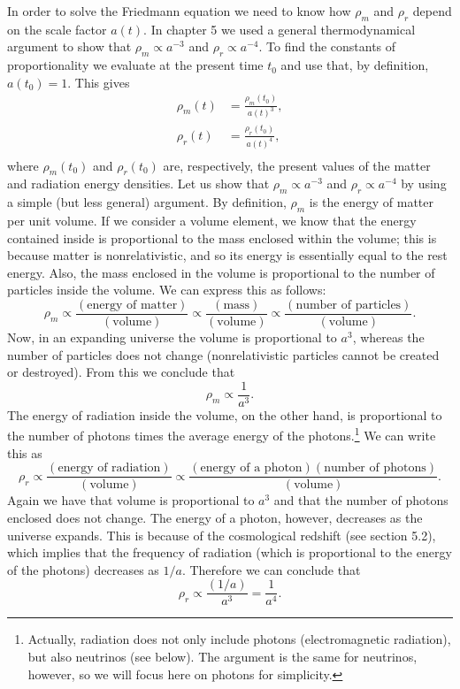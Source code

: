 \documentclass[11pt, a4paper,oneside,openright]{book}
\numberwithin{equation}{section}
\begin{document}
In order to solve the Friedmann equation we need to know how $\rho_m$ and $\rho_r$ depend on the scale factor $a(t)$. In chapter 5 we used a general thermodynamical argument to show that $\rho_m\propto a^{-3}$ and $\rho_r\propto a^{-4}$. To find the constants of proportionality we evaluate at the present time $t_0$ and use that, by definition, $a(t_0)=1$. This gives
\begin{equation}
\begin{split}
\rho_m(t)&= \frac{\rho_m(t_0)}{a(t)^3},\\
\rho_r(t)&= \frac{\rho_r(t_0)}{a(t)^4},\\
\end{split}
\end{equation}
where $\rho_m(t_0)$ and $\rho_r(t_0)$ are, respectively, the present values of the matter and radiation energy densities. Let us show that $\rho_m\propto a^{-3}$ and $\rho_r\propto a^{-4}$ by using a simple (but less general) argument. By definition, $\rho_m$ is the energy of matter per unit volume. If we consider a volume element, we know that the energy contained inside is proportional to the mass enclosed within the volume; this is because matter is nonrelativistic, and so its energy is essentially equal to the rest energy. Also, the mass enclosed in the volume is proportional to the number of particles inside the volume. We can express this as follows:
\begin{equation}
\rho_m\propto \frac{(\mbox{energy of matter})}{(\mbox{volume})}\propto \frac{(\mbox{mass})}{(\mbox{volume})}\propto \frac{(\mbox{number of particles})}{(\mbox{volume})}.
\end{equation}
Now, in an expanding universe the volume is proportional to $a^3$, whereas the number of particles does not change (nonrelativistic particles cannot be created or destroyed). From this we conclude that
\begin{equation}
\rho_m\propto \frac{1}{a^3}.
\end{equation}
The energy of radiation inside the volume, on the other hand, is proportional to the number of photons times the average energy of the photons.\footnote{Actually, radiation does not only include photons (electromagnetic radiation), but also neutrinos (see below). The argument is the same for neutrinos, however, so we will focus here on photons for simplicity.} We can write this as
\begin{equation}
\rho_r\propto \frac{(\mbox{energy of radiation})}{(\mbox{volume})}\propto \frac{(\mbox{energy of a photon})(\mbox{number of photons})}{(\mbox{volume})}.
\end{equation}
Again we have that volume is proportional to $a^3$ and that the number of photons enclosed does not change. The energy of a photon, however, decreases as the universe expands. This is because of the cosmological redshift (see section 5.2), which implies that the frequency of radiation (which is proportional to the energy of the photons) decreases as $1/a$. Therefore we can conclude that
\begin{equation}
\rho_r\propto \frac{(1/a)}{a^3}=\frac{1}{a^4}.
\end{equation}
\end{document}
